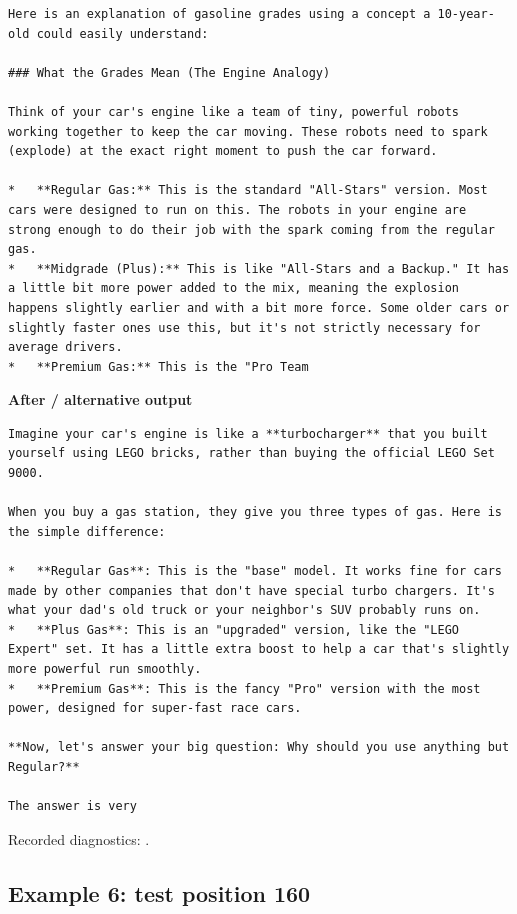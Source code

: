 \begin{Verbatim}
Here is an explanation of gasoline grades using a concept a 10-year-old could easily understand:

### What the Grades Mean (The Engine Analogy)

Think of your car's engine like a team of tiny, powerful robots working together to keep the car moving. These robots need to spark (explode) at the exact right moment to push the car forward.

*   **Regular Gas:** This is the standard "All-Stars" version. Most cars were designed to run on this. The robots in your engine are strong enough to do their job with the spark coming from the regular gas.
*   **Midgrade (Plus):** This is like "All-Stars and a Backup." It has a little bit more power added to the mix, meaning the explosion happens slightly earlier and with a bit more force. Some older cars or slightly faster ones use this, but it's not strictly necessary for average drivers.
*   **Premium Gas:** This is the "Pro Team
\end{Verbatim}

\textbf{After / alternative output}

\begin{Verbatim}
Imagine your car's engine is like a **turbocharger** that you built yourself using LEGO bricks, rather than buying the official LEGO Set 9000.

When you buy a gas station, they give you three types of gas. Here is the simple difference:

*   **Regular Gas**: This is the "base" model. It works fine for cars made by other companies that don't have special turbo chargers. It's what your dad's old truck or your neighbor's SUV probably runs on.
*   **Plus Gas**: This is an "upgraded" version, like the "LEGO Expert" set. It has a little extra boost to help a car that's slightly more powerful run smoothly.
*   **Premium Gas**: This is the fancy "Pro" version with the most power, designed for super-fast race cars.

**Now, let's answer your big question: Why should you use anything but Regular?**

The answer is very
\end{Verbatim}

Recorded diagnostics:
\texttt{}.

\subsection{Example 6: test position
160}\label{record-docs-watermarking-qualitative-text-textseal2-direct-topk-md-example-6-test-position-160}

